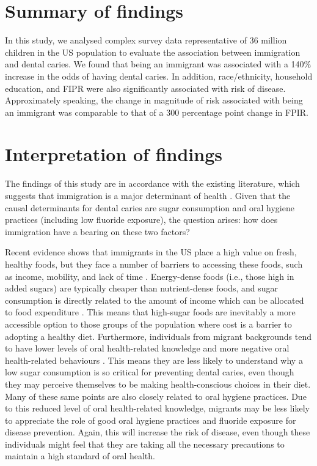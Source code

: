 \section{Summary of findings}

In this study, we analysed complex survey data representative of 36 million children in the US population to evaluate the association between immigration and dental caries. We found that being an immigrant was associated with a 140\% increase in the odds of having dental caries. In addition, race/ethnicity, household education, and FIPR were also significantly associated with risk of disease. Approximately speaking, the change in magnitude of risk associated with being an immigrant was comparable to that of a 300 percentage point change in FPIR.

\section{Interpretation of findings}

The findings of this study are in accordance with the existing literature, which suggests that immigration is a major determinant of health \citep{abubakr2018}. Given that the causal determinants for dental caries are sugar consumption and oral hygiene practices (including low fluoride exposure), the question arises: how does immigration have a bearing on these two factors?

Recent evidence shows that immigrants in the US place a high value on fresh, healthy foods, but they face a number of barriers to accessing these foods, such as income, mobility, and lack of time \citep{claussen2022}. Energy-dense foods (i.e., those high in added sugars) are typically cheaper than nutrient-dense foods, and sugar consumption is directly related to the amount of income which can be allocated to food expenditure \citep{drewnowski2004}. This means that high-sugar foods are inevitably a more accessible option to those groups of the population where cost is a barrier to adopting a healthy diet. Furthermore, individuals from migrant backgrounds tend to have lower levels of oral health-related knowledge and more negative oral health-related behaviours \citep{valdez2022}. This means they are less likely to understand why a low sugar consumption is so critical for preventing dental caries, even though they may perceive themselves to be making health-conscious choices in their diet. Many of these same points are also closely related to oral hygiene practices. Due to this reduced level of oral health-related knowledge, migrants may be less likely to appreciate the role of good oral hygiene practices and fluoride exposure for disease prevention. Again, this will increase the risk of disease, even though these individuals might feel that they are taking all the necessary precautions to maintain a high standard of oral health. 

